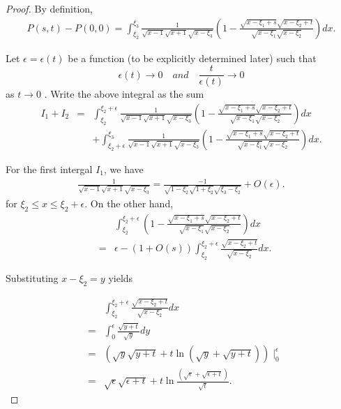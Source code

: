 \documentclass[11pt]{amsart}
\theoremstyle{plain}
\begin{document}
\begin{proof} By definition, 
\begin{align*}
P(s,t)-P(0,0)  = \int_{\xi_2}^{\xi_3}\frac{1}{\sqrt{x-1}\sqrt{x+1}\sqrt{x-\xi_3}}\left(1-\frac{\sqrt{x-\xi_1+s}\sqrt{x-\xi_2+t}}{\sqrt{x-\xi_1}\sqrt{x-\xi_2}}\right) dx.  
\end{align*}

Let $\epsilon=\epsilon(t)$ be a function (to be explicitly determined later) such that 
$$\epsilon(t) \to 0 \quad and \quad \frac{t}{\epsilon(t)} \to 0$$ as $t\to 0$ . 
Write the above integral as the sum
\begin{eqnarray*}
I_1+ I_2 &=& \int_{\xi_2}^{\xi_2+\epsilon}\frac{1}{\sqrt{x-1}\sqrt{x+1}\sqrt{x-\xi_3}}
\left(1-\frac{\sqrt{x-\xi_1+s}\sqrt{x-\xi_2+t}}{\sqrt{x-\xi_1}\sqrt{x-\xi_2}}\right)dx \\
&& + \int_{\xi_2+\epsilon}^{\xi_3}\frac{1}{\sqrt{x-1}\sqrt{x+1}\sqrt{x-\xi_3}}
\left(1-\frac{\sqrt{x-\xi_1+s}\sqrt{x-\xi_2+t}}{\sqrt{x-\xi_1}\sqrt{x-\xi_2}}\right)dx . 
\end{eqnarray*}

For the first intergal $I_1$, we have 
\begin{eqnarray}\label{equ:P}
\frac{1}{\sqrt{x-1}\sqrt{x+1}\sqrt{x-\xi_3}}
=\frac{-1}{\sqrt{1-\xi_2}\sqrt{1+\xi_2}\sqrt{\xi_3-\xi_2}}+O(\epsilon).
\end{eqnarray} 
for $\xi_2\leq x\leq \xi_2+\epsilon$. On the other hand, 
\begin{eqnarray}\label{equ:P0}
  && \int_{\xi_2}^{\xi_2+\epsilon} \left(1-\frac{\sqrt{x-\xi_1+s}\sqrt{x-\xi_2+t}}{\sqrt{x-\xi_1}\sqrt{x-\xi_2}} \right) dx \nonumber \\
  &=& \epsilon-\left(1+O(s)\right)
\int_{\xi_2}^{\xi_2+\epsilon}\frac{\sqrt{x-\xi_2+t}}{\sqrt {x-\xi_2}} dx .
\end{eqnarray}


Substituting $x-\xi_2=y$ yields

\begin{eqnarray}\label{equ:P1}
    && \int_{\xi_2}^{\xi_2+\epsilon}\frac{\sqrt{x-\xi_2+t}}{\sqrt {x-\xi_2}}dx  \nonumber  \\ 
    &=&\int_0^\epsilon\frac{\sqrt{y+t}}{\sqrt{y}}dy \nonumber  \\
    &=& \left( \sqrt{y}\sqrt{y+t}+t\ln (\sqrt{y}+\sqrt{y+t})\right)\mid_0^\epsilon \nonumber  \\
    &=&\sqrt{\epsilon}\sqrt{\epsilon+t}+t\ln \frac{(\sqrt{\epsilon}+\sqrt{\epsilon+t})}{\sqrt{t}}.  
    \end{eqnarray}


\end{proof}
\end{document}
